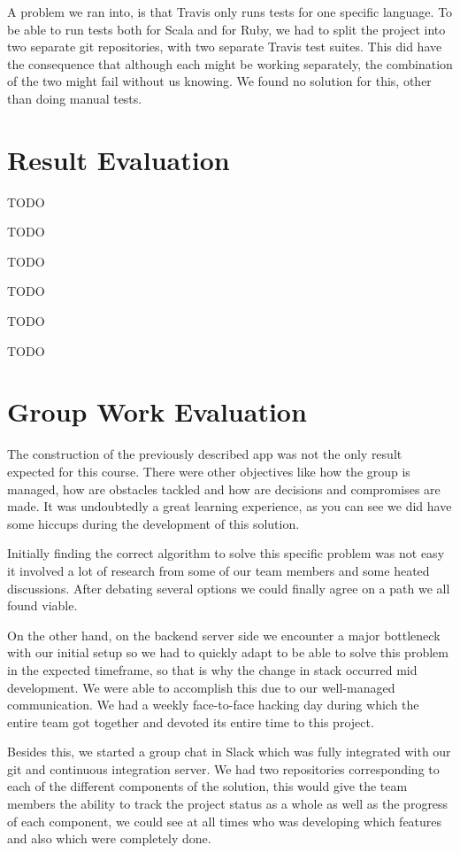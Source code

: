 A problem we ran into, is that Travis only runs tests for one specific language. To be able to run tests both for Scala and for Ruby, we had to split the project into two separate git repositories, with two separate Travis test suites. This did have the consequence that although each might be working separately, the combination of the two might fail without us knowing. We found no solution for this, other than doing manual tests.

\section{Result Evaluation}
TODO

TODO

TODO

TODO

TODO

TODO

\section{Group Work Evaluation}
The construction of the previously described app was not the only result expected for this course. There were other objectives like how the group is managed, how are obstacles tackled and how are decisions and compromises are made. It was undoubtedly a great learning experience, as you can see we did have some hiccups during the development of this solution. 

Initially finding the correct algorithm to solve this specific problem was not easy it involved a lot of research from some of our team members and some heated discussions. After debating several options we could finally agree on a path we all found viable.

On the other hand, on the backend server side we encounter a major bottleneck with our initial setup so we had to quickly adapt to be able to solve this problem in the expected timeframe, so that is why the change in stack occurred mid development. We were able to accomplish this due to our well-managed communication. We had a weekly face-to-face hacking day during which the entire team got together and devoted its entire time to this project.

Besides this, we started a group chat in Slack which was fully integrated with our git and continuous integration server. We had two repositories corresponding to each of the different components of the solution, this would give the team members the ability to track the project status as a whole as well as the progress of each component, we could see at all times who was developing which features and also which were completely done. 

